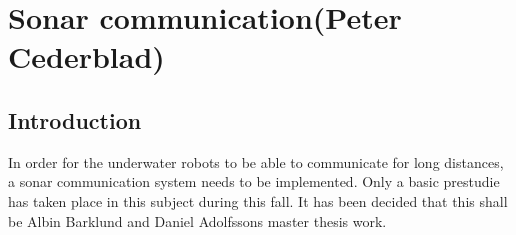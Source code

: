 

\section{Sonar communication(Peter Cederblad)}
\label{sec:Sonarcommunication}

\subsection{Introduction}
In order for the underwater robots to be able to communicate for long distances, a sonar communication system needs to be implemented.
Only a basic prestudie has taken place in this subject during this fall. It has been decided that this shall be Albin Barklund and Daniel Adolfssons master thesis work.
